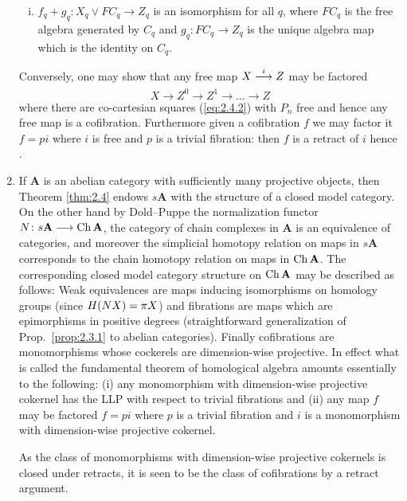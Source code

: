 \documentclass[../main]{subfiles}
\begin{document}
\begin{remarks*}
\begin{enumerate}
\begin{enumerate}[(i)]
        \item $f_q + g_q \colon X_q \vee FC_q \longrightarrow Z_q$ is an isomorphism for all $q$, where $FC_q$ is the free algebra generated by $C_q$ and $g_q\colon FC_q \longrightarrow Z_q$ is the unique algebra map which is the identity on $C_q$.
    \end{enumerate}
    Conversely, one may show \cite[Thm.\ 6.1]{kan_css_1957-1} that any free map $X \varrightarrow i Z$ may be factored \[X \longrightarrow Z^0 \longrightarrow Z^1 \longrightarrow \dots \longrightarrow Z\] where there are co-cartesian squares (\ref{eq:2.4.2}) with $P_n$ free and hence any free map is a cofibration. Furthermore given a cofibration $f$ we may factor it $f = pi$ where $i$ is free and $p$ is a trivial fibration: then $f$ is a retract of $i$ hence .
    
    \item If $\mathbf{A}$ is an abelian category with sufficiently many projective objects, then Theorem \ref{thm:2.4} endows $s\mathbf{A}$ with the structure of a closed model category. On the other hand by Dold--Puppe \cite{dold_homologie_1961} the normalization functor\\ $N \colon s\mathbf{A} \longrightarrow \operatorname{Ch} \mathbf{A}$, the category of chain complexes in $\mathbf{A}$ is an equivalence of categories, and moreover the simplicial homotopy relation on maps in $s\mathbf{A}$ corresponds to the chain homotopy relation on maps in $\operatorname{Ch}\mathbf{A}$. The corresponding closed model category structure on $\operatorname{Ch}\mathbf{A}$ may be described as follows: Weak equivalences are maps inducing isomorphisms on homology groups (since $H(NX) = \pi X$) and fibrations are maps which are epimorphisms in positive degrees (straightforward generalization of Prop.\ \ref{prop:2.3.1} to abelian categories). Finally cofibrations are monomorphisms whose cockerels are dimension-wise projective. In effect what is called the fundamental theorem of homological algebra amounts essentially to the following: (i) any monomorphism with dimension-wise projective cokernel has the LLP with respect to trivial fibrations and (ii) any map $f$ may be factored $f = pi$ where $p$ is a trivial fibration and $i$ is a monomorphism with dimension-wise projective cokernel.

    As the class of monomorphisms with dimension-wise projective cokernels is closed under retracts, it is seen to be the class of cofibrations by a retract argument.
\end{enumerate}
\end{remarks*}
\end{document}
